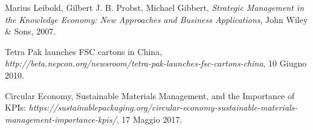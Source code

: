 \documentclass[paper=a4, fontsize=11pt,x11names]{report}
\begin{document}


\begin{thebibliography}{9}


 Marius Leibold, Gilbert J. B. Probst, Michael Gibbert,
  \textit{Strategic Management in the Knowledge Economy: New Approaches and Business Applications},
  John Wiley \& Sons,
 2007.
 
	Tetra Pak launches FSC cartons in China, \textit{http://beta.nepcon.org/newsroom/tetra-pak-launches-fsc-cartons-china},
	10 Giugno 2010.
	
	Circular Economy, Sustainable Materials Management, and the Importance of KPIs: \textit{https://sustainablepackaging.org/circular-economy-sustainable-materials-management-importance-kpis/},
	17 Maggio 2017.

\end{thebibliography}


\end{document}
